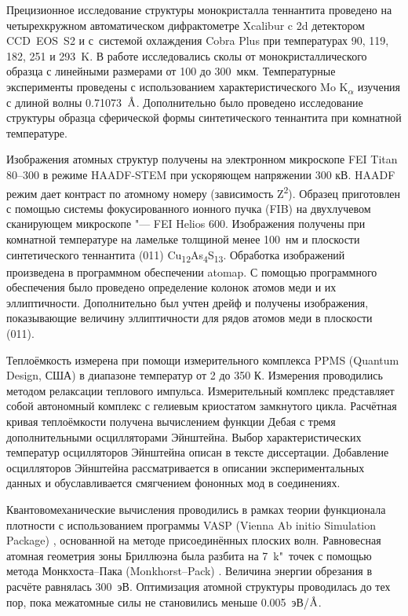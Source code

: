 Прецизионное исследование структуры монокристалла теннантита проведено на четырехкружном автоматическом дифрактометре Xcalibur c 2d детектором  CCD~EOS~S2 и с~системой охлаждения Cobra Plus при температурах 90, 119, 182, 251 и 293~K.
В работе исследовались сколы от монокристаллического образца с линейными размерами от 100 до 300~мкм.
Температурные эксперименты проведены с использованием характеристического Mo K\textsubscript{$\alpha$} изучения с длиной волны 0.71073~$\mbox{\normalfont\AA}$. Дополнительно было проведено исследование структуры образца сферической формы синтетического теннантита при комнатной температуре.

Изображения атомных структур получены на электронном микроскопе FEI Titan 80--300 в режиме HAADF-STEM  при ускоряющем напряжении 300 кВ.
HAADF режим дает контраст по атомному номеру (зависимость Z\textsuperscript{2}).
Образец приготовлен с помощью системы фокусированного ионного пучка (FIB) на двухлучевом сканирующем микроскопе "--- FEI Helios 600.
Изображения получены при комнатной температуре на ламельке толщиной менее 100~нм и плоскости синтетического теннантита (011) Cu\textsubscript{12}As\textsubscript{4}S\textsubscript{13}.
Обработка изображений произведена в программном обеспечении atomap\cite{Nord2017}. С помощью программного обеспечения было проведено определение колонок атомов меди и их эллиптичности. Дополнительно был учтен дрейф и получены изображения, показывающие величину эллиптичности для рядов атомов меди в плоскости (011).

Теплоёмкость измерена при помощи измерительного комплекса PPMS (Quantum Design,
США) в диапазоне температур от 2 до 350 К. Измерения проводились методом релаксации теплового импульса\cite{Hwang_1997}. Измерительный комплекс представляет собой автономный комплекс с гелиевым криостатом замкнутого цикла. Расчётная кривая теплоёмкости получена вычислением функции Дебая с тремя дополнительными осцилляторами Эйнштейна. Выбор характеристических температур осцилляторов Эйнштейна описан в тексте диссертации. Добавление осцилляторов Эйнштейна рассматривается в описании экспериментальных данных и обуславливается смягчением фононных мод в соединениях.

Квантовомеханические вычисления проводились в рамках теории функционала плотности с использованием программы VASP (Vienna Ab initio Simulation Package) \cite{Kresse1993,Kresse1994,Kresse1996}, основанной на методе присоединённых плоских волн. Равновесная атомная геометрия зоны Бриллюэна была разбита  на 7~k"~точек с помощью метода Монкхоста--Пака (Monkhorst--Pack) \cite{Monkhorst_1976}. Величина энергии обрезания в расчёте равнялась 300~эВ. Оптимизация атомной структуры проводилась до тех пор, пока межатомные силы не становились меньше 0.005~эВ/${\mbox{\normalfont\AA}}$.


